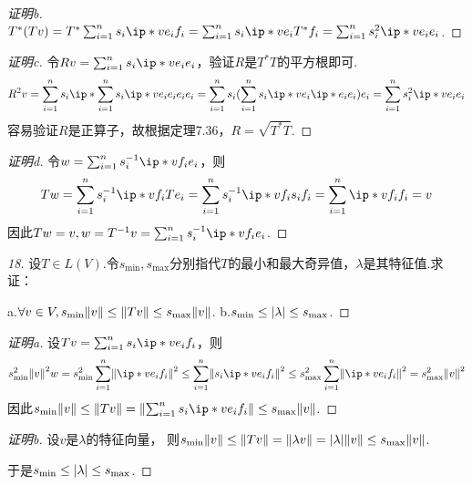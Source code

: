 \begin{proof}[证明b]
    \(T^*(Tv)=T^*\sum_{i=1}^n s_i \ip*{v}{e_i}f_i=\sum_{i=1}^n s_i \ip*{v}{e_i}T^*f_i=\sum_{i=1}^n s_i^2 \ip*{v}{e_i}e_i\).
\end{proof}

\begin{proof}[证明c]
    令\(Rv=\sum_{i=1}^n s_i\ip*{v}{e_i}e_i\)，验证\(R\)是\(T^*T\)的平方根即可.
    \begin{align*}
        R^2v=\sum_{i=1}^n s_i\ip*{\sum_{i=1}^n s_i\ip*{v}{e_i}e_i}{e_i}e_i
        =\sum_{i=1}^n s_i (\sum_{i=1}^n s_i\ip*{v}{e_i}\ip*{e_i}{e_i})e_i
        =\sum_{i=1}^n s_i^2\ip*{v}{e_i}e_i
    \end{align*}
    容易验证\(R\)是正算子，故根据定理7.36，\(R=\sqrt{T^*T}\).
\end{proof}

\begin{proof}[证明d]
    令\(w=\sum_{i=1}^n s_i^{-1}\ip*{v}{f_i}e_i\)，则
    \begin{align*}
        Tw=\sum_{i=1}^n s_i^{-1}\ip*{v}{f_i}Te_i=\sum_{i=1}^n s_i^{-1}\ip*{v}{f_i}s_if_i
        =\sum_{i=1}^n \ip*{v}{f_i}f_i=v
    \end{align*}
    因此\(Tw=v,w=T^{-1}v=\sum_{i=1}^n s_i^{-1}\ip*{v}{f_i}e_i\).
\end{proof}

\begin{proof}[18]\label{7.D.18}
    设\(T \in L(V)\).令\(s_{\min},s_{\max}\)分别指代\(T\)的最小和最大奇异值，\(\lambda\)是其特征值.求证：

    a.\(\forall v \in V,s_{\min}\norm*{v} \leq \norm*{Tv} \leq s_{\max}\norm*{v}\). \quad
    b.\(s_{\min} \leq \abs*{\lambda} \leq s_{\max}\).
\end{proof}

\begin{proof}[证明a]
    设\(Tv=\sum_{i=1}^n s_i\ip*{v}{e_i}f_i\)，则
    \begin{align*}
        s_{\min}^2\norm*{v}^2w=s_{\min}^2 \sum_{i=1}^n \norm*{\ip*{v}{e_i}f_i}^2 
        \leq \sum_{i=1}^n \norm*{s_i\ip*{v}{e_i}f_i}^2 
        \leq s_{\max}^2 \sum_{i=1}^n \norm*{\ip*{v}{e_i}f_i}^2=s_{\max}^2\norm*{v}^2
    \end{align*}
    因此\(s_{\min}\norm*{v} \leq \norm*{Tv}=\norm*{\sum_{i=1}^n s_i\ip*{v}{e_i}f_i} \leq s_{\max}\norm*{v}\).
\end{proof}

\begin{proof}[证明b]
    设\(v\)是\(\lambda\)的特征向量，
    则\(s_{\min}\norm*{v}\leq \norm*{Tv}=\norm*{\lambda v}=\abs*{\lambda}\norm*{v} \leq s_{\max}\norm*{v}\).
    
    于是\(s_{\min} \leq \abs*{\lambda} \leq s_{\max}\).
\end{proof}

